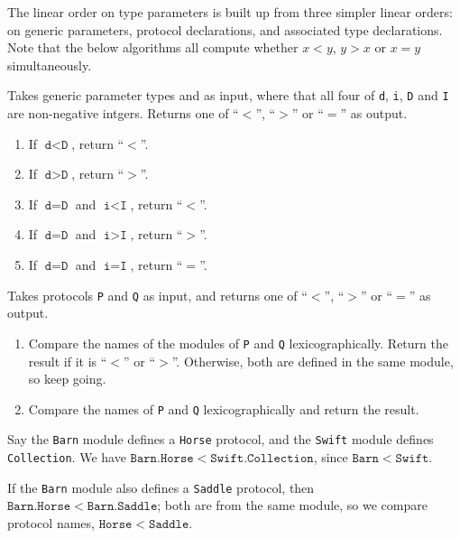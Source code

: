 \documentclass[../generics]{subfiles}
\begin{document}
The linear order on type parameters is built up from three simpler linear orders: on generic parameters, protocol declarations, and associated type declarations. Note that the below algorithms all compute whether $x<y$, $y>x$ or $x=y$ simultaneously.
\begin{algorithm}\label{generic parameter order} Takes generic parameter types  and  as input, where that all four of \texttt{d}, \texttt{i}, \texttt{D} and \texttt{I} are non-negative intgers. Returns one of ``$<$'', ``$>$'' or ``$=$'' as output.
\begin{enumerate}
\item If $\texttt{d}<\texttt{D}$, return ``$<$''.
\item If $\texttt{d}>\texttt{D}$, return ``$>$''.
\item If $\texttt{d}=\texttt{D}$ and $\texttt{i}<\texttt{I}$, return ``$<$''.
\item If $\texttt{d}=\texttt{D}$ and $\texttt{i}>\texttt{I}$, return ``$>$''.
\item If $\texttt{d}=\texttt{D}$ and $\texttt{i}=\texttt{I}$, return ``$=$''.
\end{enumerate}
\end{algorithm}
%
\begin{algorithm} \label{linear protocol order} Takes protocols \texttt{P} and \texttt{Q} as input, and returns one of ``$<$'', ``$>$'' or ``$=$'' as output.
\begin{enumerate}
\item Compare the names of the modules of \texttt{P} and \texttt{Q} lexicographically. Return the result if it is ``$<$'' or ``$>$''. Otherwise, both are defined in the same module, so keep going.
\item Compare the names of \texttt{P} and \texttt{Q} lexicographically and return the result.
\end{enumerate}
\end{algorithm}
\begin{example}
Say the \texttt{Barn} module defines a \texttt{Horse} protocol, and the \texttt{Swift} module defines \texttt{Collection}. We have $\mathtt{Barn.Horse}<\mathtt{Swift.Collection}$, since $\mathtt{Barn}<\mathtt{Swift}$.

If the \texttt{Barn} module also defines a \texttt{Saddle} protocol, then $\mathtt{Barn.Horse}<\mathtt{Barn.Saddle}$; both are from the same module, so we compare protocol names, $\mathtt{Horse}<\mathtt{Saddle}$.
\end{example}
\end{document}
